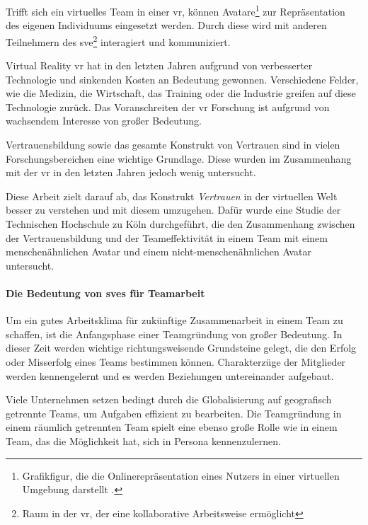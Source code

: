 \documentclass[a4paper,11pt]{article}%
\renewcommand{\\}{\vspace*{0.5\baselineskip} \newline}
\begin{document}
Trifft sich ein virtuelles Team in einer \ac{vr}, können Avatare\footnote{Grafikfigur, die die Onlinerepräsentation eines Nutzers in einer virtuellen Umgebung darstellt \citep[S. 196]{neitzel2010bin}.} zur Repräsentation des eigenen Individuums eingesetzt werden. Durch diese wird mit anderen Teilnehmern des \ac{sve}\footnote{Raum in der \ac{vr}, der eine kollaborative Arbeitsweise ermöglicht} interagiert und kommuniziert.

Virtual Reality \ac{vr} hat in den letzten Jahren aufgrund von verbesserter Technologie und sinkenden Kosten an Bedeutung gewonnen. Verschiedene Felder, wie die Medizin, die Wirtschaft, das Training oder die Industrie greifen auf diese Technologie zurück. Das Voranschreiten der \ac{vr} Forschung ist aufgrund von wachsendem Interesse von großer Bedeutung. 

Vertrauensbildung sowie das gesamte Konstrukt von Vertrauen sind in vielen Forschungsbereichen eine wichtige Grundlage. Diese wurden im Zusammenhang mit der \ac{vr} in den letzten Jahren jedoch wenig untersucht. 

Diese Arbeit zielt darauf ab, das Konstrukt \textit{Vertrauen} in der virtuellen Welt besser zu verstehen und mit diesem umzugehen. Dafür wurde eine Studie der Technischen Hochschule zu Köln durchgeführt, die den Zusammenhang zwischen der Vertrauensbildung und der Teameffektivität in einem Team mit einem menschenähnlichen Avatar und einem nicht-menschenähnlichen Avatar untersucht.

\paragraph{Die Bedeutung von \ac{sve}s für Teamarbeit}
	Um ein gutes Arbeitsklima für zukünftige Zusammenarbeit in einem Team zu schaffen, ist die Anfangsphase einer Teamgründung von großer Bedeutung. In dieser Zeit werden wichtige richtungsweisende Grundsteine gelegt, die den Erfolg oder Misserfolg eines Teams bestimmen können. Charakterzüge der Mitglieder werden kennengelernt und es werden Beziehungen untereinander aufgebaut.
	
Viele Unternehmen setzen bedingt durch die Globalisierung auf geografisch getrennte Teams, um Aufgaben effizient zu bearbeiten. Die Teamgründung in einem räumlich getrennten Team spielt eine ebenso große Rolle wie in einem Team, das die Möglichkeit hat, sich in Persona kennenzulernen.
\end{document}
